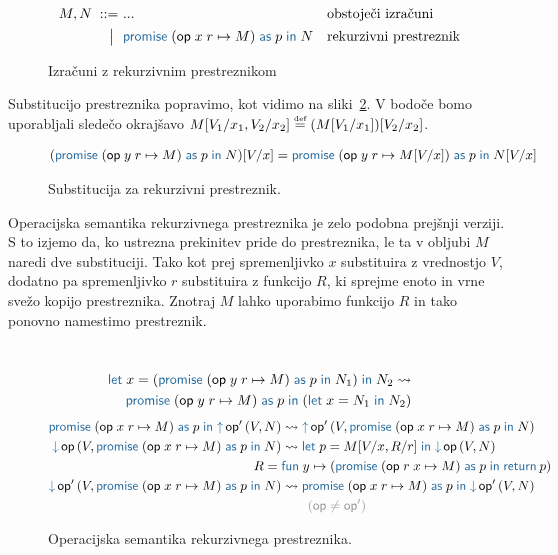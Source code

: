 \begin{figure}[H]
	\centering
	\small
	\begin{align*}
		M, N
		\bnfis& ...                            & &\text{obstoječi izračuni} \\
		\bnfor& \tmwithrec{op}{x}{r}{M}{p}{N}  & &\text{rekurzivni prestreznik}
	\end{align*}
	
	\caption{Izračuni z rekurzivnim prestreznikom}
	\label{fig:izrazi-prestreznik}
\end{figure}

Substitucijo prestreznika popravimo, kot vidimo na sliki~\ref{fig:substitucija-prestreznik}. V bodoče bomo uporabljali sledečo okrajšavo $M[V_1/x_1, V_2/x_2] \mathrel{\overset{\text{\tiny def}}{=}} (M[V_1/x_1])[V_2/x_2]$.

\begin{figure}[H]
	\centering
	\small
	\begin{align*}
		(\tmwithrec{op}{y}{r}{M}{p}{N})[V/x] &= \tmwithrec{op}{y}{r}{M[V/x]}{p}{N[V/x]}
	\end{align*}
	\vspace{-5ex}
	\caption{Substitucija za rekurzivni prestreznik.}
	\label{fig:substitucija-prestreznik}
\end{figure}

Operacijska semantika rekurzivnega prestreznika je zelo podobna prejšnji verziji. S to izjemo da, ko ustrezna prekinitev pride do prestreznika, le ta v obljubi $M$ naredi dve substituciji. Tako kot prej spremenljivko $x$ substituira z vrednostjo $V$, dodatno pa spremenljivko $r$ substituira z funkcijo $R$, ki sprejme enoto in vrne svežo kopijo prestreznika. Znotraj $M$ lahko uporabimo funkcijo $R$ in tako ponovno namestimo prestreznik. 

\begin{figure}[H]
	\centering
	\small~
	\begin{align*}
		\tmlet{x}{(\tmwithrec{op}{y}{r}{M}{p}{N_1})}{N_2} \reduces \\
		\tmwithrec{op}{y}{r}{M}{p}{(\tmlet{x}{N_1}{N_2})}
	\end{align*}
	\vspace{-6ex}
	\begin{align*}
		\tmwithrec{op}{x}{r}{M}{p}{\tmopout{op'}{V}{N}} &\reduces \tmopout{op'}{V}{\tmwithrec{op}{x}{r}{M}{p}{N}}
		\\
		\tmopin{op}{V}{\tmwithrec{op}{x}{r}{M}{p}{N}} &\reduces \tmlet{p}{M[V/x, R/r]}{\tmopin{op}{V}{N}} \\
		R = \;& \tmfunano{y}{(\tmwithrec{op}{r}{x}{M}{p}{\tmreturn{p}})} \\
		\tmopin{op'}{V}{\tmwithrec{op}{x}{r}{M}{p}{N}} &\reduces \tmwithrec{op}{x}{r}{M}{p}{\tmopin{op'}{V}{N}} \\
		&\qquad {\color{rulenameColor}(\op \neq \op')}
	\end{align*}
	
	\caption{Operacijska semantika rekurzivnega prestreznika.}
	\label{fig:semantika-prestreznik}
\end{figure}

